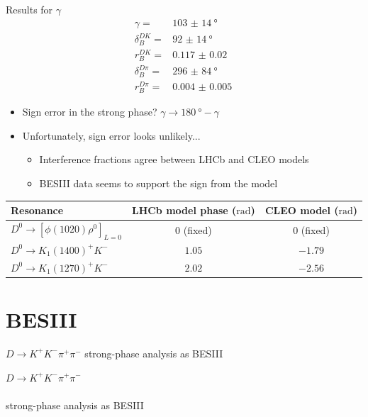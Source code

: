 \documentclass{beamer}
\begin{document}
\begin{frame}{Results for $\gamma$}
  \vspace{-0.8cm}
  \begin{align*}
    \gamma =& \SI{103(14)}{\degree} \\
    \delta_B^{DK} =& \SI{92(14)}{\degree} \\
    r_B^{DK} =& \SI{0.117(20)}{} \\
    \delta_B^{D\pi} =& \SI{296(84)}{\degree} \\
    r_B^{D\pi} =& \SI{0.004(5)}{}
  \end{align*}
  \vspace{-0.8cm}
  \begin{itemize}
    \item{Sign error in the strong phase? $\gamma\to\SI{180}{\degree} - \gamma$}
    \item{Unfortunately, sign error looks unlikely...}
    \begin{itemize}
      \item{Interference fractions agree between LHCb and CLEO models}
      \item{BESIII data seems to support the sign from the model}
    \end{itemize}
  \end{itemize}
  \vspace{0.1cm}
  \begin{tabular}{l|c|c}
    Resonance                           & LHCb model phase ($\si{\radian}$) & CLEO model ($\si{\radian}$) \\
    \hline
    $D^0\to[\phi(1020)\rho^0]_{L = 0}$  & $0$ (fixed)                       & $0$ (fixed) \\
    $D^0\to K_1(1400)^+K^-$             & $1.05$                            & $-1.79$ \\
    $D^0\to K_1(1270)^+K^-$             & $2.02$                            & $-2.56$ \\
    \hline
  \end{tabular}
\end{frame}

\section{BESIII}

\begin{frame}{$D\to K^+K^-\pi^+\pi^-$ strong-phase analysis as BESIII}
  \begin{center}
    {\huge $D\to K^+K^-\pi^+\pi^-$ \\~\\strong-phase analysis as BESIII}
  \end{center}
\end{frame}
\end{document}
